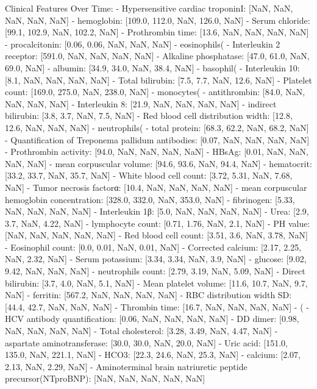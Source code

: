 \begin{tcolorbox}[colback=cadmiumgreen!5!white,colframe=forestgreen!75!white,breakable,title=\textit{Basic setting prompt template for the mortality prediction task on the TJH.}]
\begin{VerbatimWrap}
Clinical Features Over Time:
- Hypersensitive cardiac troponinI: [NaN, NaN, NaN, NaN, NaN]
- hemoglobin: [109.0, 112.0, NaN, 126.0, NaN]
- Serum chloride: [99.1, 102.9, NaN, 102.2, NaN]
- Prothrombin time: [13.6, NaN, NaN, NaN, NaN]
- procalcitonin: [0.06, 0.06, NaN, NaN, NaN]
- eosinophils(%
- Interleukin 2 receptor: [591.0, NaN, NaN, NaN, NaN]
- Alkaline phosphatase: [47.0, 61.0, NaN, 69.0, NaN]
- albumin: [34.9, 34.0, NaN, 38.4, NaN]
- basophil(%
- Interleukin 10: [8.1, NaN, NaN, NaN, NaN]
- Total bilirubin: [7.5, 7.7, NaN, 12.6, NaN]
- Platelet count: [169.0, 275.0, NaN, 238.0, NaN]
- monocytes(%
- antithrombin: [84.0, NaN, NaN, NaN, NaN]
- Interleukin 8: [21.9, NaN, NaN, NaN, NaN]
- indirect bilirubin: [3.8, 3.7, NaN, 7.5, NaN]
- Red blood cell distribution width: [12.8, 12.6, NaN, NaN, NaN]
- neutrophils(%
- total protein: [68.3, 62.2, NaN, 68.2, NaN]
- Quantification of Treponema pallidum antibodies: [0.07, NaN, NaN, NaN, NaN]
- Prothrombin activity: [94.0, NaN, NaN, NaN, NaN]
- HBsAg: [0.01, NaN, NaN, NaN, NaN]
- mean corpuscular volume: [94.6, 93.6, NaN, 94.4, NaN]
- hematocrit: [33.2, 33.7, NaN, 35.7, NaN]
- White blood cell count: [3.72, 5.31, NaN, 7.68, NaN]
- Tumor necrosis factorα: [10.4, NaN, NaN, NaN, NaN]
- mean corpuscular hemoglobin concentration: [328.0, 332.0, NaN, 353.0, NaN]
- fibrinogen: [5.33, NaN, NaN, NaN, NaN]
- Interleukin 1β: [5.0, NaN, NaN, NaN, NaN]
- Urea: [2.9, 3.7, NaN, 4.22, NaN]
- lymphocyte count: [0.71, 1.76, NaN, 2.1, NaN]
- PH value: [NaN, NaN, NaN, NaN, NaN]
- Red blood cell count: [3.51, 3.6, NaN, 3.78, NaN]
- Eosinophil count: [0.0, 0.01, NaN, 0.01, NaN]
- Corrected calcium: [2.17, 2.25, NaN, 2.32, NaN]
- Serum potassium: [3.34, 3.34, NaN, 3.9, NaN]
- glucose: [9.02, 9.42, NaN, NaN, NaN]
- neutrophils count: [2.79, 3.19, NaN, 5.09, NaN]
- Direct bilirubin: [3.7, 4.0, NaN, 5.1, NaN]
- Mean platelet volume: [11.6, 10.7, NaN, 9.7, NaN]
- ferritin: [567.2, NaN, NaN, NaN, NaN]
- RBC distribution width SD: [44.4, 42.7, NaN, NaN, NaN]
- Thrombin time: [16.7, NaN, NaN, NaN, NaN]
- (%
- HCV antibody quantification: [0.06, NaN, NaN, NaN, NaN]
- DD dimer: [0.98, NaN, NaN, NaN, NaN]
- Total cholesterol: [3.28, 3.49, NaN, 4.47, NaN]
- aspartate aminotransferase: [30.0, 30.0, NaN, 20.0, NaN]
- Uric acid: [151.0, 135.0, NaN, 221.1, NaN]
- HCO3: [22.3, 24.6, NaN, 25.3, NaN]
- calcium: [2.07, 2.13, NaN, 2.29, NaN]
- Aminoterminal brain natriuretic peptide precursor(NTproBNP): [NaN, NaN, NaN, NaN, NaN]

\end{VerbatimWrap}
\end{tcolorbox}
